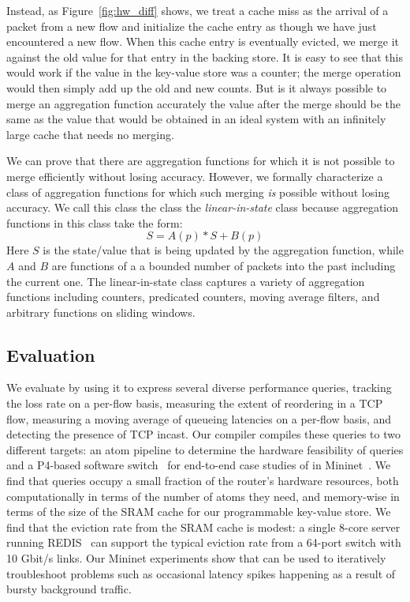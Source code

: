 Instead, as Figure~\ref{fig:hw_diff} shows, we treat a cache miss as the
arrival of a packet from a new flow and initialize the cache entry as though we
have just encountered a new flow. When this cache entry is eventually evicted,
we merge it against the old value for that entry in the backing store. It is
easy to see that this would work if the value in the key-value store was a
counter; the merge operation would then simply add up the old and new counts.
But is it always possible to merge an aggregation function accurately \ie the
value after the merge should be the same as the value that would be obtained in
an ideal system with an infinitely large cache that needs no merging.

We can prove that there are aggregation functions for which it is not possible
to merge efficiently without losing accuracy. However, we formally characterize
a class of aggregation functions for which such merging {\em is} possible
without losing accuracy. We call this class the class the {\em linear-in-state}
class because aggregation functions in this class take the form:
\begin{equation}
S = A(p) * S + B(p)
\end{equation}
Here $S$ is the state/value that is being updated by the aggregation function,
while $A$ and $B$ are functions of a a bounded number of packets into the past
including the current one. The linear-in-state class captures a variety of
aggregation functions including counters, predicated counters, moving average
filters, and arbitrary functions on sliding windows.

\subsection{Evaluation} We evaluate \TheSystem by using it to express several
diverse performance queries, \eg tracking the loss rate on a per-flow basis,
measuring the extent of reordering in a TCP flow, measuring a moving average of
queueing latencies on a per-flow basis, and detecting the presence of TCP
incast. Our \TheSystem compiler compiles these queries to two different
targets: an atom pipeline to determine the hardware feasibility of \TheSystem
queries and a P4-based software switch~\cite{p4-bmv2} for end-to-end case
studies of \TheSystem in Mininet~\cite{mininet}. We find that \TheSystem
queries occupy a small fraction of the router's hardware resources, both
computationally in terms of the number of atoms they need, and memory-wise in
terms of the size of the SRAM cache for our programmable key-value store. We
find that the eviction rate from the SRAM cache is modest: a single 8-core
server running REDIS~\cite{redis} can support the typical eviction rate from a
64-port switch with 10 Gbit/s links.  Our Mininet experiments show that
\TheSystem can be used to iteratively troubleshoot problems such as occasional
latency spikes happening as a result of bursty background traffic.

